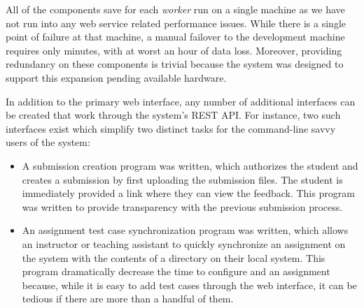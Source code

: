 All of the components save for each \emph{worker} run on a single machine as we
have not run into any web service related performance issues. While there is a
single point of failure at that machine, a manual failover to the development
machine requires only minutes, with at worst an hour of data loss. Moreover,
providing redundancy on these components is trivial because the system was
designed to support this expansion pending available hardware.

In addition to the primary web interface, any number of additional interfaces
can be created that work through the system's REST API. For instance, two such
interfaces exist which simplify two distinct tasks for the command-line savvy
users of the system:

\begin{itemize}
\item A submission creation program was written, which authorizes the student
  and creates a submission by first uploading the submission files. The student
  is immediately provided a link where they can view the feedback. This program
  was written to provide transparency with the previous submission process.
\item An assignment test case synchronization program was written, which allows
  an instructor or teaching assistant to quickly synchronize an assignment on
  the system with the contents of a directory on their local system. This
  program dramatically decrease the time to configure and an assignment
  because, while it is easy to add test cases through the web interface, it can
  be tedious if there are more than a handful of them.
\end{itemize}
